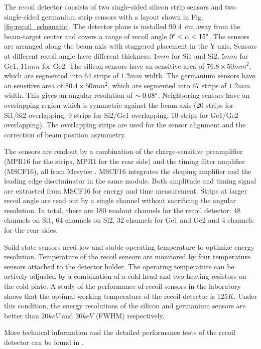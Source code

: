 \documentclass[number,5p]{elsarticle}
\begin{document}
The recoil detector consists of two single-sided silicon strip sensors and two
single-sided germanium strip sensors with a layout shown in Fig. \ref{fig:recoil_schematic}.
The detector plane is installed \SI{90.4}{\cm} away from the beam-target center
and covers a range of recoil angle $0\degree < \alpha < 15\degree$.
The sensors are arranged along the beam axis with staggered placement in the Y-axis.
Sensors at different recoil angle have different thickness: $1 mm$ for Si1 and Si2, $5 mm$ for Ge1, $11 mm$ for Ge2.
The silicon sensors have an sensitive area of \(76.8 \times 50 mm^2\), which are
segmented into 64 strips of $1.2 mm$ width.
The germanium sensors have an sensitive area of \(80.4 \times 50 mm^2\), which are segmented into 67 strips of $1.2 mm$ width.
This gives an angular resolution of $\sim0.08\degree$.
Neighboring sensors have an overlapping region which is symmetric against
the beam axis (20 strips for Si1/Si2 overlapping, 9 strips for Si2/Ge1 overlapping, 10 strips for Ge1/Ge2 overlapping).
The overlapping strips are used for the sensor alignment and the correction of beam position asymmetry.

The sensors are readout by a combination of the charge-sensitive preamplifier (MPR16 for the strips, MPR1 for the rear side) 
and the timing filter amplifier (MSCF16), all from Mesytec \cite{mesytec}. 
MSCF16 integrates the shaping amplifier and the leading edge discriminator in the same module.
Both amplitude and timing signal are extracted from MSCF16 for energy and time measurement.
Strips at larger recoil angle are read out by a single channel without sacrificing the angular resolution.
In total, there are 180 readout channels for the recoil detector: 
48 channels on Si1, 64 channels on Si2, 32 channels for Ge1 and Ge2 and 4
channels for the rear sides. 

Soild-state sensors need low and stable operating temperature to optimize energy
resolution.
Temperature of the recoil sensors are monitored by four temperature sensors
attached to the detector holder.
The operating temperature can be actively adjusted by a combination of a cold head and two heating resistors on the cold plate.
A study of the performance of recoil sensors in the laboratory shows that the
optimal working temperature of the recoil detector is $125 K$.
Under this condition, the energy resolutions of the silicon and germanium
sensors are better than $20 keV$ and $30 keV$ (FWHM) respectively.

More technical information and the detailed performance tests of the recoil detector can be found in \cite{recoil_article}.
\end{document}
